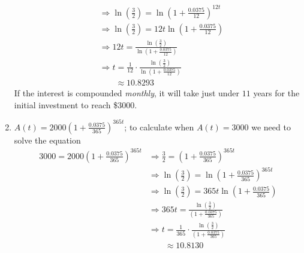 \begin{pccexample}
\begin{pccsolution}
\begin{enumerate}
\begin{align*}
				                                                  & \Rightarrow \ln\left(\frac{3}{2}\right)=\ln \left( 1+\frac{0.0375}{12}\right)^{12t}                        \\
				                                                  & \Rightarrow \ln\left(\frac{3}{2}\right)=12t\ln\left( 1+\frac{0.0375}{12} \right)                           \\
				                                                  & \Rightarrow 12t= \frac{\ln\left(\frac{3}{2}\right)}{\ln\left( 1+\frac{0.0375}{12} \right)}                 \\
				                                                  & \Rightarrow t= \frac{1}{12}\cdot \frac{\ln\left(\frac{3}{2}\right)}{\ln\left( 1+\frac{0.0375}{12} \right)} \\
				                                                  & \phantom{ {}\Rightarrow t}\approx 10.8293                                                                  
			\end{align*}
			If the interest is compounded \emph{monthly}, it will take just under $11$ years for the 
			initial investment to reach \$3000.
			\item $A(t)=2000\left( 1+\frac{0.0375}{365} \right)^{365t}$; to calculate when $A(t)=3000$ we need to solve the 
			equation
			\begin{align*}
				3000=2000\left( 1+\frac{0.0375}{365} \right)^{365t} & \Rightarrow \frac{3}{2}=\left( 1+\frac{0.0375}{365} \right)^{365t}                                           \\
				                                                    & \Rightarrow \ln\left( \frac{3}{2} \right)=\ln\left( 1+\frac{0.0375}{365} \right)^{365t}                      \\
				                                                    & \Rightarrow \ln\left( \frac{3}{2} \right)=365t \ln\left( 1+\frac{0.0375}{365} \right)                        \\
				                                                    & \Rightarrow 365t = \frac{\ln\left( \frac{3}{2} \right)}{\left( 1+\frac{0.0375}{365} \right)}                 \\
				                                                    & \Rightarrow t = \frac{1}{365}\cdot \frac{\ln\left( \frac{3}{2} \right)}{\left( 1+\frac{0.0375}{365} \right)} \\
				                                                    & \phantom{ {}\Rightarrow t}\approx 10.8130                                                                    

\end{align*}
\end{enumerate}
\end{pccsolution}
\end{pccexample}
